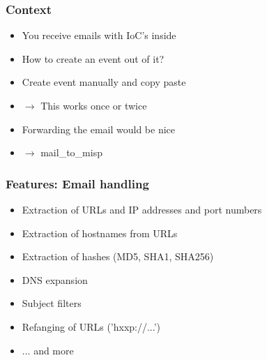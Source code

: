 

\begin{frame}[t,plain]
\titlepage
\end{frame}

\begin{frame}
    \frametitle{Context}
    \begin{itemize}
        \item You receive emails with IoC's inside
        \item How to create an event out of it?
        \item Create event manually and copy paste
        \item $\to$ This works once or twice
        \item Forwarding the email would be nice
        \item $\to$ mail\_to\_misp
    \end{itemize}
\end{frame}

\begin{frame}
    \frametitle{Features: Email handling}
    \begin{itemize}
        \item Extraction of URLs and IP addresses and port numbers
        \item Extraction of hostnames from URLs
        \item Extraction of hashes (MD5, SHA1, SHA256)
        \item DNS expansion
        \item Subject filters
        \item Refanging of URLs ('hxxp://...')
        \item ... and more
    \end{itemize}
\end{frame}

